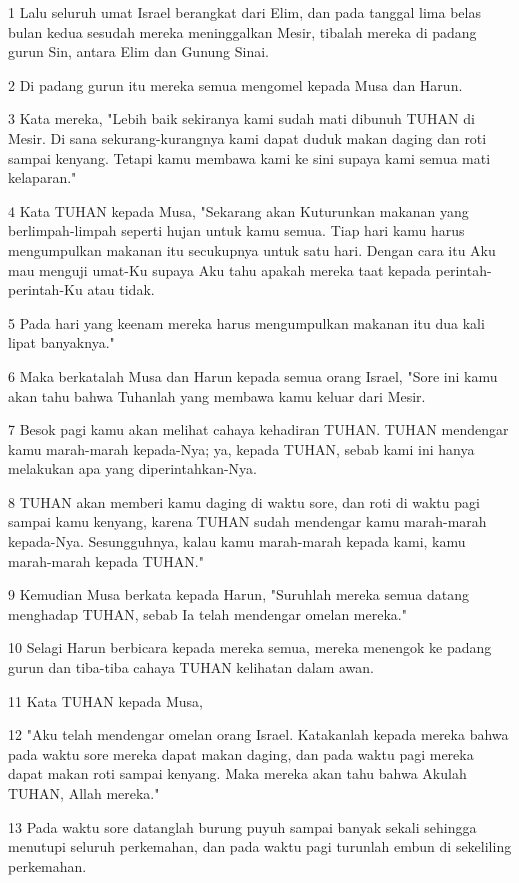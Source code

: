 \par 1 Lalu seluruh umat Israel berangkat dari Elim, dan pada tanggal lima belas bulan kedua sesudah mereka meninggalkan Mesir, tibalah mereka di padang gurun Sin, antara Elim dan Gunung Sinai.
\par 2 Di padang gurun itu mereka semua mengomel kepada Musa dan Harun.
\par 3 Kata mereka, "Lebih baik sekiranya kami sudah mati dibunuh TUHAN di Mesir. Di sana sekurang-kurangnya kami dapat duduk makan daging dan roti sampai kenyang. Tetapi kamu membawa kami ke sini supaya kami semua mati kelaparan."
\par 4 Kata TUHAN kepada Musa, "Sekarang akan Kuturunkan makanan yang berlimpah-limpah seperti hujan untuk kamu semua. Tiap hari kamu harus mengumpulkan makanan itu secukupnya untuk satu hari. Dengan cara itu Aku mau menguji umat-Ku supaya Aku tahu apakah mereka taat kepada perintah-perintah-Ku atau tidak.
\par 5 Pada hari yang keenam mereka harus mengumpulkan makanan itu dua kali lipat banyaknya."
\par 6 Maka berkatalah Musa dan Harun kepada semua orang Israel, "Sore ini kamu akan tahu bahwa Tuhanlah yang membawa kamu keluar dari Mesir.
\par 7 Besok pagi kamu akan melihat cahaya kehadiran TUHAN. TUHAN mendengar kamu marah-marah kepada-Nya; ya, kepada TUHAN, sebab kami ini hanya melakukan apa yang diperintahkan-Nya.
\par 8 TUHAN akan memberi kamu daging di waktu sore, dan roti di waktu pagi sampai kamu kenyang, karena TUHAN sudah mendengar kamu marah-marah kepada-Nya. Sesungguhnya, kalau kamu marah-marah kepada kami, kamu marah-marah kepada TUHAN."
\par 9 Kemudian Musa berkata kepada Harun, "Suruhlah mereka semua datang menghadap TUHAN, sebab Ia telah mendengar omelan mereka."
\par 10 Selagi Harun berbicara kepada mereka semua, mereka menengok ke padang gurun dan tiba-tiba cahaya TUHAN kelihatan dalam awan.
\par 11 Kata TUHAN kepada Musa,
\par 12 "Aku telah mendengar omelan orang Israel. Katakanlah kepada mereka bahwa pada waktu sore mereka dapat makan daging, dan pada waktu pagi mereka dapat makan roti sampai kenyang. Maka mereka akan tahu bahwa Akulah TUHAN, Allah mereka."
\par 13 Pada waktu sore datanglah burung puyuh sampai banyak sekali sehingga menutupi seluruh perkemahan, dan pada waktu pagi turunlah embun di sekeliling perkemahan.

